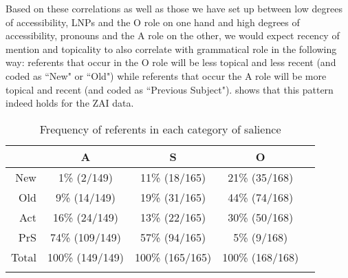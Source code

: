 Based on these correlations as well as those we have set up between low degrees of accessibility, LNPs and the O role on one hand and high degrees of accessibility, pronouns and the A role on the other, we would expect recency of mention and topicality to also correlate with grammatical role in the following way: referents that occur in the O role will be less topical and less recent (and coded as ``New" or ``Old") while referents that occur the A role will be more topical and recent (and coded as ``Previous Subject").  shows that this pattern indeed holds for the ZAI data.
\begin{table}

\caption{{Frequency of referents in each category of salience}}
\begin{tabular}{ r  c  c  c  c }
\lsptoprule
  & \textsc{A} & \textsc{S} & \textsc{O} \\

\midrule 
 New & 1{\%} (2/149) & 11{\%} (18/165) & 21{\%} (35/168)   \\

 Old & 9{\%} (14/149) & 19{\%} (31/165) & 44{\%} (74/168)  \\

  Act & 16{\%} (24/149) & 13{\%} (22/165) & 30{\%} (50/168)  \\

 PrS & 74{\%} (109/149) & 57{\%} (94/165) & 5{\%} (9/168) \\

\midrule
 Total& 100{\%} (149/149)  & 100{\%} (165/165)  &  100{\%} (168/168)\\

\lspbottomrule
\end{tabular}\\
\label{totalsalience1}

\end{table}


